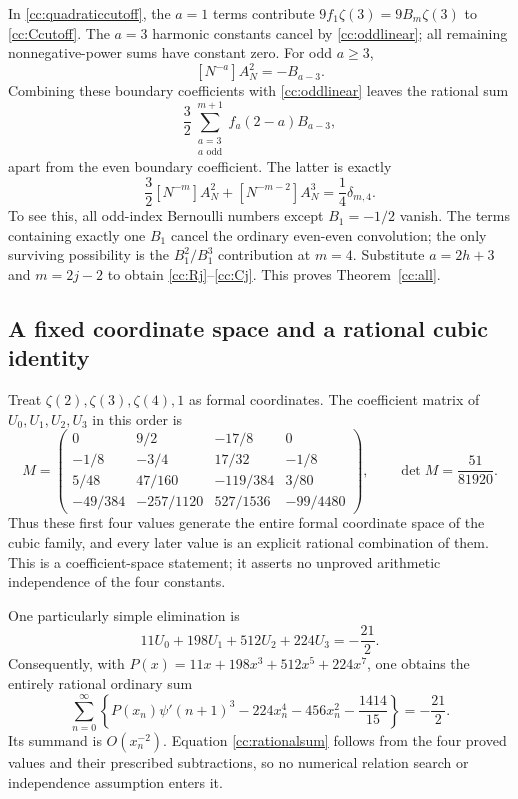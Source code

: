 In \eqref{cc:quadraticcutoff}, the $a=1$ terms contribute
$9f_1\zeta(3)=9B_m\zeta(3)$ to \eqref{cc:Ccutoff}.
The $a=3$ harmonic constants cancel by \eqref{cc:oddlinear}; all
remaining nonnegative-power sums have constant zero.
For odd $a\ge3$,
\[
 [N^{-a}]A_N^2=-B_{a-3}.
\]
Combining these boundary coefficients with \eqref{cc:oddlinear}
leaves the rational sum
\[
 \frac32\sum_{\substack{a=3\\a\text{ odd}}}^{m+1}
          f_a(2-a)B_{a-3},
\]
apart from the even boundary coefficient.  The latter is exactly
\begin{equation}\label{cc:boundaryexception}
 \frac32[N^{-m}]A_N^2+[N^{-m-2}]A_N^3
       =\frac14\delta_{m,4}.
\end{equation}
To see this, all odd-index Bernoulli numbers except $B_1=-1/2$
vanish.  The terms containing exactly one $B_1$ cancel the ordinary
even-even convolution; the only surviving possibility is the
$B_1^2/B_1^3$ contribution at $m=4$.
Substitute $a=2h+3$ and $m=2j-2$ to obtain
\eqref{cc:Rj}--\eqref{cc:Cj}.  This proves
Theorem~\ref{cc:all}.

\subsection{A fixed coordinate space and a rational cubic identity}

Treat $\zeta(2),\zeta(3),\zeta(4),1$ as formal coordinates.
The coefficient matrix of $U_0,U_1,U_2,U_3$ in this order is
\begin{equation}\label{cc:matrix}
 M=\begin{pmatrix}
 0&9/2&-17/8&0\\
 -1/8&-3/4&17/32&-1/8\\
 5/48&47/160&-119/384&3/80\\
 -49/384&-257/1120&527/1536&-99/4480
 \end{pmatrix},\qquad
 \det M=\frac{51}{81920}.
\end{equation}
Thus these first four values generate the entire formal coordinate
space of the cubic family, and every later value is an explicit
rational combination of them.  This is a coefficient-space statement;
it asserts no unproved arithmetic independence of the four constants.

One particularly simple elimination is
\begin{equation}\label{cc:rationalmoment}
 11U_0+198U_1+512U_2+224U_3=-\frac{21}{2}.
\end{equation}
Consequently, with
$P(x)=11x+198x^3+512x^5+224x^7$, one obtains the entirely rational
ordinary sum
\begin{equation}\label{cc:rationalsum}
 \boxed{\displaystyle
 \sum_{n=0}^{\infty}\left\{
 P(x_n)\psi'(n+1)^3-224x_n^4-456x_n^2-\frac{1414}{15}
 \right\}=-\frac{21}{2}.}
\end{equation}
Its summand is $O(x_n^{-2})$.  Equation \eqref{cc:rationalsum}
follows from the four proved values and their prescribed subtractions,
so no numerical relation search or independence assumption enters it.

